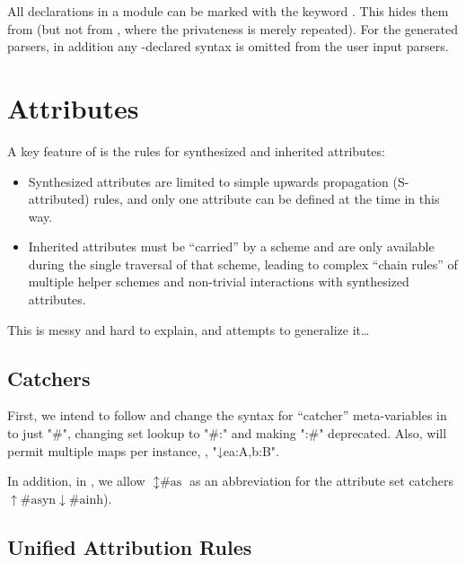 \documentclass[11pt]{article} %
\begin{document}
All declarations in a module can be marked with the keyword . This hides them from
 (but not from , where the privateness is merely repeated). For the generated
parsers, in addition any -declared syntax is omitted from the user input parsers.


\section{Attributes}\label{sec:attributes}

A key feature of  is the rules for synthesized and inherited attributes:
\begin{itemize}

\item Synthesized attributes are limited to simple upwards propagation (S-attributed) rules, and
  only one attribute can be defined at the time in this way.

\item Inherited attributes must be ``carried'' by a scheme and are only available during the single
  traversal of that scheme, leading to complex ``chain rules'' of multiple helper schemes and
  non-trivial interactions with synthesized attributes.

\end{itemize}
This is messy and hard to explain, and  attempts to generalize it…

\subsection{Catchers}

First, we intend to follow \hax and change the syntax for ``catcher'' meta-variables in  to
just "{#}", changing set lookup to "{#:}" and making "{:#}" deprecated. Also,  will permit
multiple maps per instance, \eg, "↓e{a:A,b:B}".

In addition, in , we allow ${↕}\text{\#as}$ as an abbreviation for the attribute set catchers
${↑}\text{\#asyn}{↓}\text{\#ainh}$).

\subsection{Unified Attribution Rules}
\end{document}

